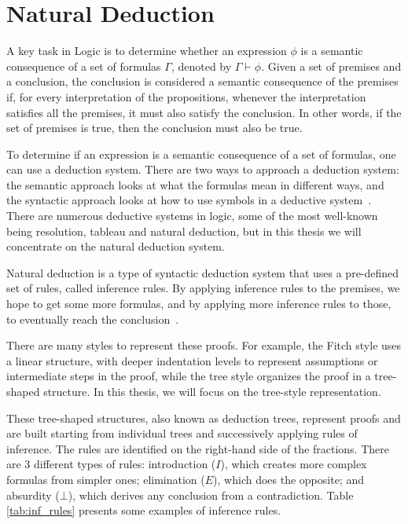 \section{Natural Deduction} 

\label{chap:prop-deduction}
A key task in Logic is to determine whether an expression \(\phi\) is a semantic consequence of a set of formulas \(\Gamma\), denoted by \(\Gamma \vdash \phi\). Given a set of premises and a conclusion, the conclusion is considered a semantic consequence of the premises if, for every interpretation of the propositions, whenever the interpretation satisfies all the premises, it must also satisfy the conclusion. In other words, if the set of premises is true, then the conclusion must also be true. 

To determine if an expression is a semantic consequence of a set of formulas, one can use a deduction system. There are two ways to approach a deduction system: the semantic approach looks at what the formulas mean in different ways, and the syntactic approach looks at how to use symbols in a deductive system~\cite{gouveia_lgica}. There are numerous deductive systems in logic, some of the most well-known being  resolution, tableau and natural deduction, but in this thesis we will concentrate on the natural deduction system.

Natural deduction is a type of syntactic deduction system that uses a pre-defined set of rules, called inference rules. By applying inference rules to the premises, we hope to get some more formulas, and by applying more inference rules to those, to eventually reach the conclusion~\cite{huth_2004_logic}.

There are many styles to represent these proofs. For example, the Fitch style uses a linear structure, with deeper indentation levels to represent assumptions or intermediate steps in the proof, while the tree style organizes the proof in a tree-shaped structure. In this thesis, we will focus on the tree-style representation. 

These tree-shaped structures, also known as deduction trees, represent proofs and are built starting from individual trees and successively applying rules of inference. The rules are identified on the right-hand side of the fractions. There are 3 different types of rules: introduction (\(I\)), which creates more complex formulas from simpler ones; elimination (\(E\)), which does the opposite; and absurdity (\(\bot\)), which derives any conclusion from a contradiction. Table \ref{tab:inf_rules} presents some examples of inference rules.

